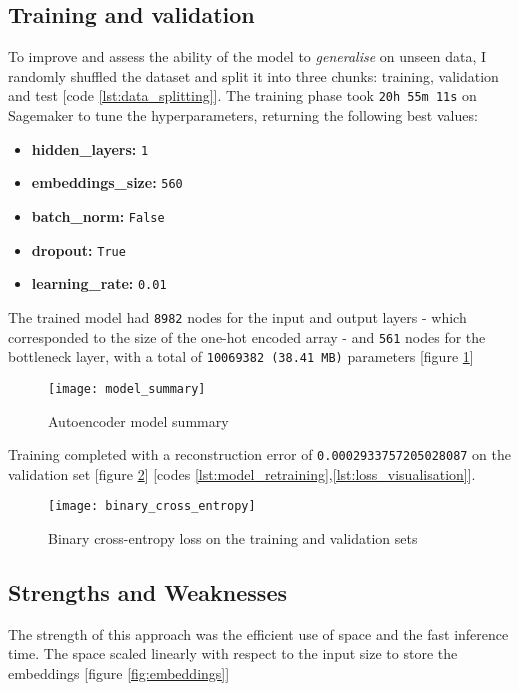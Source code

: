 \subsection{Training and validation}

To improve and assess the ability of the model to \textit{generalise} on unseen data, I randomly shuffled the dataset and split
it into three chunks: training, validation and test [code \ref{lst:data_splitting}].
The training phase took \verb|20h 55m 11s| on Sagemaker to tune the hyperparameters,
returning the following best values:

\begin{itemize}
  \item \textbf{hidden\_layers:} \verb|1|
  \item \textbf{embeddings\_size:} \verb|560|
  \item \textbf{batch\_norm:} \verb|False|
  \item \textbf{dropout:} \verb|True|
  \item \textbf{learning\_rate:} \verb|0.01|
\end{itemize}

The trained model had \verb|8982| nodes for the input and output layers - which corresponded to the size of
the one-hot encoded array - and \verb|561| nodes for the bottleneck layer, with a total of \verb|10069382 (38.41 MB)|
parameters [figure \ref{fig:model_summary}]

\begin{figure}[H]
  \centering
  \texttt{[image: model\_summary]}
  \caption{Autoencoder model summary}
  \label{fig:model_summary}
\end{figure}

Training completed with a reconstruction error of \verb|0.0002933757205028087| on the validation set
[figure \ref{fig:binary_cross_entropy}] [codes \ref{lst:model_retraining},\ref{lst:loss_visualisation}].

\begin{figure}[H]
  \centering
  \texttt{[image: binary\_cross\_entropy]}
  \caption{Binary cross-entropy loss on the training and validation sets}
  \label{fig:binary_cross_entropy}
\end{figure}

\subsection{Strengths and Weaknesses}

The strength of this approach was the efficient use of space and the fast inference time.
The space scaled linearly with respect to the input size to store the embeddings [figure \ref{fig:embeddings}]

